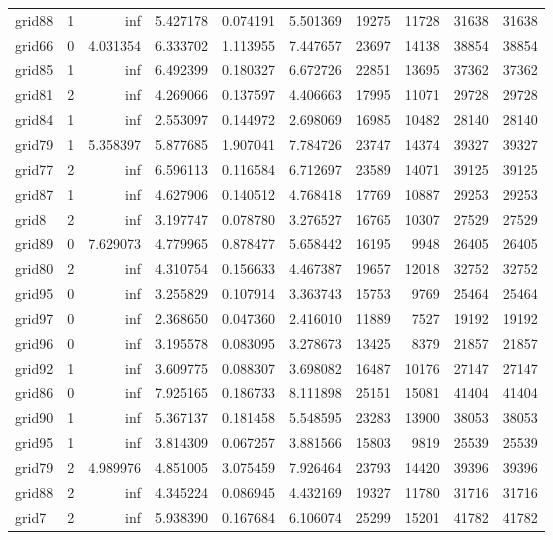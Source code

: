 \begin{longtable}{|l|r|r|r|r|r|r|r|r|r|}
grid88 & 1 & inf & 5.427178 & 0.074191 & 5.501369 & 19275 & 11728 & 31638 & 31638 \\
grid66 & 0 & 4.031354 & 6.333702 & 1.113955 & 7.447657 & 23697 & 14138 & 38854 & 38854 \\
grid85 & 1 & inf & 6.492399 & 0.180327 & 6.672726 & 22851 & 13695 & 37362 & 37362 \\
grid81 & 2 & inf & 4.269066 & 0.137597 & 4.406663 & 17995 & 11071 & 29728 & 29728 \\
grid84 & 1 & inf & 2.553097 & 0.144972 & 2.698069 & 16985 & 10482 & 28140 & 28140 \\
grid79 & 1 & 5.358397 & 5.877685 & 1.907041 & 7.784726 & 23747 & 14374 & 39327 & 39327 \\
grid77 & 2 & inf & 6.596113 & 0.116584 & 6.712697 & 23589 & 14071 & 39125 & 39125 \\
grid87 & 1 & inf & 4.627906 & 0.140512 & 4.768418 & 17769 & 10887 & 29253 & 29253 \\
grid8 & 2 & inf & 3.197747 & 0.078780 & 3.276527 & 16765 & 10307 & 27529 & 27529 \\
grid89 & 0 & 7.629073 & 4.779965 & 0.878477 & 5.658442 & 16195 & 9948 & 26405 & 26405 \\
grid80 & 2 & inf & 4.310754 & 0.156633 & 4.467387 & 19657 & 12018 & 32752 & 32752 \\
grid95 & 0 & inf & 3.255829 & 0.107914 & 3.363743 & 15753 & 9769 & 25464 & 25464 \\
grid97 & 0 & inf & 2.368650 & 0.047360 & 2.416010 & 11889 & 7527 & 19192 & 19192 \\
grid96 & 0 & inf & 3.195578 & 0.083095 & 3.278673 & 13425 & 8379 & 21857 & 21857 \\
grid92 & 1 & inf & 3.609775 & 0.088307 & 3.698082 & 16487 & 10176 & 27147 & 27147 \\
grid86 & 0 & inf & 7.925165 & 0.186733 & 8.111898 & 25151 & 15081 & 41404 & 41404 \\
grid90 & 1 & inf & 5.367137 & 0.181458 & 5.548595 & 23283 & 13900 & 38053 & 38053 \\
grid95 & 1 & inf & 3.814309 & 0.067257 & 3.881566 & 15803 & 9819 & 25539 & 25539 \\
grid79 & 2 & 4.989976 & 4.851005 & 3.075459 & 7.926464 & 23793 & 14420 & 39396 & 39396 \\
grid88 & 2 & inf & 4.345224 & 0.086945 & 4.432169 & 19327 & 11780 & 31716 & 31716 \\
grid7 & 2 & inf & 5.938390 & 0.167684 & 6.106074 & 25299 & 15201 & 41782 & 41782 \\

\end{longtable}
